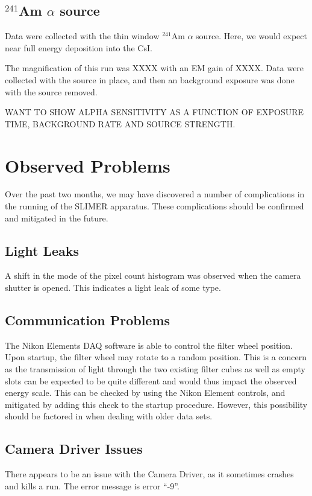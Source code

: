 \documentclass[11pt]{article}
\newcommand{\nuc}[2]{\ensuremath{^{#1}}#2}
\begin{document}
 
\subsection{\nuc{241}{Am} $\alpha$ source } 
Data were collected with the thin window \nuc{241}{Am} $\alpha$ source. Here, we would expect near full energy deposition into the CsI. 

The magnification of this run was XXXX with an EM gain of XXXX. 
Data were collected with the source in place, and then an background exposure was done with the source removed. 


WANT TO SHOW ALPHA SENSITIVITY AS A FUNCTION OF EXPOSURE TIME, BACKGROUND RATE AND SOURCE STRENGTH.
 
  
\section{Observed Problems}
Over the past two months, we may have discovered a number of complications in the running of the SLIMER apparatus. These complications should be confirmed and mitigated in the future.

\subsection{Light Leaks}
A shift in the mode of the pixel count histogram was observed when the camera shutter is opened. This indicates a light leak of some type. 

\subsection{Communication Problems}
The Nikon Elements DAQ software is able to control the filter wheel position. Upon startup, the filter wheel may rotate to a random position. This is a concern as the transmission of 
light through the two existing filter cubes as well as empty slots can be expected to be quite different and would thus impact the observed energy scale.
This can be checked by using the Nikon Element controls, and mitigated by adding this check to the startup procedure. However, this possibility should be factored in
when dealing with older data sets. 


\subsection{Camera Driver Issues}
There appears to be an issue with the Camera Driver, as it sometimes crashes and kills a run. The error message is error ``-9''.
\end{document}
